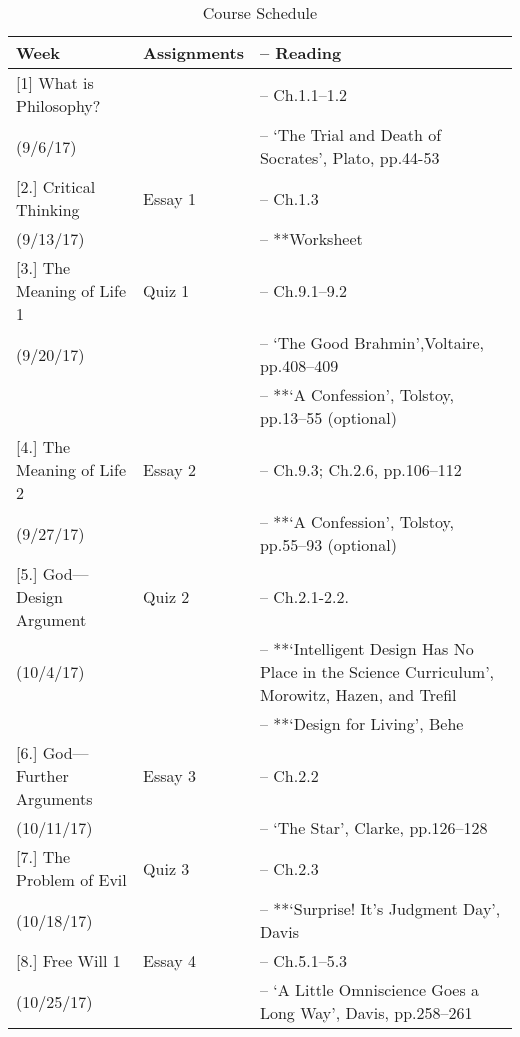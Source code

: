\documentclass[article,oneside]{memoir}
\begin{document}
\begin{center}
\begin{longtable}{p{4.5cm}p{2cm}>{-- }p{6cm}}
 
  \caption{Course Schedule} \\
  \toprule
  \textbf{Week} &\textbf{Assignments} & \textbf{Reading} \\
  \midrule

  

[1] What is Philosophy?		& 	 			& Ch.1.1--1.2  \\
(9/6/17)					&				&  `The Trial and Death of Socrates', Plato, pp.44-53   \\  [1.8\baselineskip]

[2.] Critical Thinking		 	& Essay 1			&  Ch.1.3 \\
(9/13/17)					&				&  **Worksheet \\  [1.8\baselineskip]

[3.] The Meaning of Life 1		& Quiz 1			&  Ch.9.1--9.2 \\
(9/20/17)					&				&  `The Good Brahmin',Voltaire, pp.408--409 \\
						&				& **`A Confession', Tolstoy, pp.13--55 (optional)\\ [1.8\baselineskip]
	
[4.] The Meaning of Life 2		& Essay 2			&  Ch.9.3;  Ch.2.6, pp.106--112\\
(9/27/17)					& 				&  **`A Confession', Tolstoy, pp.55--93 (optional) \\  [1.8\baselineskip]

[5.] God---Design Argument 	& Quiz 2			& Ch.2.1-2.2.\\ 
(10/4/17)					&				& **`Intelligent Design Has No Place in the Science Curriculum', Morowitz, Hazen, and Trefil\\
						&				& **`Design for Living', Behe\\   [1.8\baselineskip]

[6.] God---Further Arguments	& Essay 3			&   Ch.2.2\\
(10/11/17)					&				& `The Star', Clarke, pp.126--128\\ [1.8\baselineskip]

[7.] The Problem of Evil 		& Quiz 3			& Ch.2.3\\
(10/18/17)					& 				& **`Surprise! It's Judgment Day',  Davis\\  [1.8\baselineskip]		

[8.] Free Will 1 				& Essay 4			& Ch.5.1--5.3 \\
(10/25/17)					&				&  `A Little Omniscience Goes a Long Way', Davis, pp.258--261 \\  [1.8\baselineskip]


\end{longtable}
\end{center}
\end{document}
